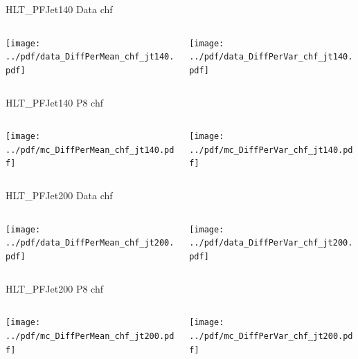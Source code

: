 \documentclass[9pt]{beamer}
\begin{document}
\begin{frame}[t]{HLT\_PFJet140 Data chf}
\begin{columns}[T]
  \begin{column}{.5\textwidth}
  \texttt{[image: ../pdf/data\_DiffPerMean\_chf\_jt140.pdf]}
  \end{column}
  \begin{column}{.5\textwidth}
  \texttt{[image: ../pdf/data\_DiffPerVar\_chf\_jt140.pdf]}
  \end{column}
\end{columns}
\end{frame}

\begin{frame}[t]{HLT\_PFJet140 P8 chf}
\begin{columns}[T]
  \begin{column}{.5\textwidth}
  \texttt{[image: ../pdf/mc\_DiffPerMean\_chf\_jt140.pdf]}
  \end{column}
  \begin{column}{.5\textwidth}
  \texttt{[image: ../pdf/mc\_DiffPerVar\_chf\_jt140.pdf]}
  \end{column}
\end{columns}
\end{frame}

\begin{frame}[t]{HLT\_PFJet200 Data chf}
\begin{columns}[T]
  \begin{column}{.5\textwidth}
  \texttt{[image: ../pdf/data\_DiffPerMean\_chf\_jt200.pdf]}
  \end{column}
  \begin{column}{.5\textwidth}
  \texttt{[image: ../pdf/data\_DiffPerVar\_chf\_jt200.pdf]}
  \end{column}
\end{columns}
\end{frame}

\begin{frame}[t]{HLT\_PFJet200 P8 chf}
\begin{columns}[T]
  \begin{column}{.5\textwidth}
  \texttt{[image: ../pdf/mc\_DiffPerMean\_chf\_jt200.pdf]}
  \end{column}
  \begin{column}{.5\textwidth}
  \texttt{[image: ../pdf/mc\_DiffPerVar\_chf\_jt200.pdf]}
  \end{column}
\end{columns}
\end{frame}
\end{document}

